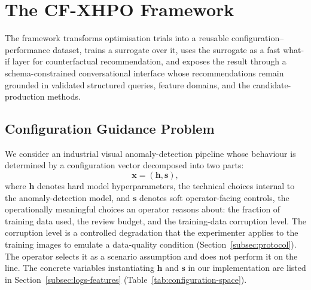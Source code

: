 \documentclass[final,5p,times,twocolumn]{elsarticle}
\begin{document}
\section{The CF-XHPO Framework}
\label{sec:method}

The framework transforms optimisation trials into a reusable
configuration--performance dataset, trains a surrogate over it, uses
the surrogate as a fast what-if layer for counterfactual recommendation,
and exposes the result through a schema-constrained conversational
interface whose recommendations remain grounded in validated structured
queries, feature domains, and the candidate-production methods.

\subsection{Configuration Guidance Problem}
\label{subsec:problem-formulation}

We consider an industrial visual anomaly-detection pipeline whose
behaviour is determined by a configuration vector decomposed into two
parts:
\begin{equation}
    \mathbf{x} = (\mathbf{h}, \mathbf{s}),
    \label{eq:configuration}
\end{equation}
where $\mathbf{h}$ denotes hard model hyperparameters, the technical
choices internal to the anomaly-detection model, and $\mathbf{s}$
denotes soft operator-facing controls, the operationally meaningful
choices an operator reasons about: the fraction of training data used,
the review budget, and the training-data corruption level. The
corruption level is a controlled degradation that the experimenter
applies to the training images to emulate a data-quality condition
(Section~\ref{subsec:protocol}). The operator selects it as a scenario
assumption and does not perform it on the line. The concrete variables instantiating $\mathbf{h}$ and
$\mathbf{s}$ in our implementation are listed in
Section~\ref{subsec:logs-features} (Table~\ref{tab:configuration-space}).
\end{document}
